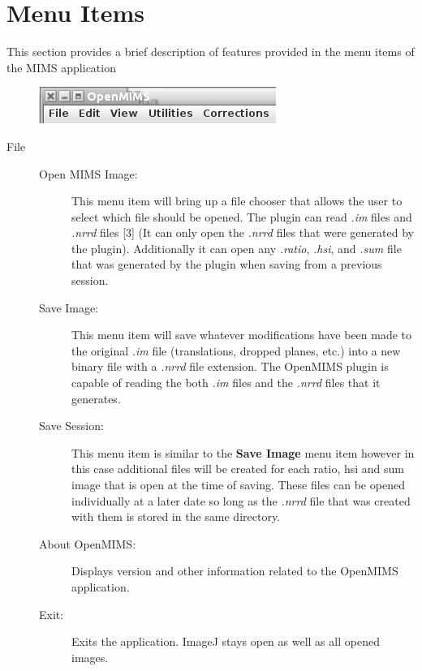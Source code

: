 \documentclass{article}
\begin{document}
\section*{Menu Items}
	\noindent This section provides a brief description of features provided in the menu items
	of the MIMS application
	\begin{figure}[h]
	\includegraphics[scale=0.60]{snapshot_MenuItems.png}
	\end{figure}
	\begin{description}
	
	\item[\large{File}] \indent                       
	
	\begin{description}
	
	\item[Open MIMS Image:] This menu item will bring up a file chooser that allows the user to select 
	which file should be opened. The plugin can read \textit{.im} files and \textit{.nrrd} files [3] (It 
	can only open the \textit{.nrrd} files that were generated by the plugin). Additionally it can open
	any \textit{.ratio}, \textit{.hsi}, and \textit{.sum} file that was generated by the plugin
	when saving from a previous session.
	
	\item[Save Image:]  This menu item will save whatever modifications have been made to the original
	\textit{.im} file (translations, dropped planes, etc.) into a new binary file with a \textit{.nrrd}
	file extension. The OpenMIMS plugin is capable of reading the both \textit{.im} files and the \textit{.nrrd}
	files that it generates.
	
	\item[Save Session:] This menu item is similar to the \textbf{Save Image} menu item however 
	in this case additional files will be created for each ratio, hsi and sum image that is 
	open at the time of saving. These files can be opened individually at a later date so long
	as the \textit{.nrrd} file that was created with them is stored in the same directory.

	\item[About OpenMIMS:] Displays version and other information related to the OpenMIMS application.
	
	\item[Exit:] Exits the application. ImageJ stays open as well as all opened images.  
	

\end{description}
\end{description}
\end{document}
